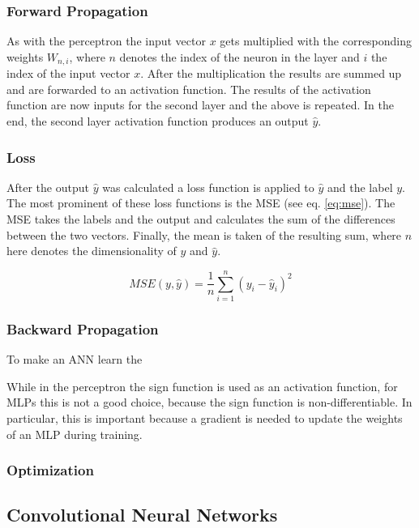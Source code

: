 \subsubsection{Forward Propagation}
As with the perceptron the input vector $x$ gets multiplied with the corresponding weights $W_{n,i}$, where $n$ denotes the index of the neuron in the layer and $i$ the index of the input vector $x$.
After the multiplication the results are summed up and are forwarded to an activation function.
The results of the activation function are now inputs for the second layer and the above is repeated.
In the end, the second layer activation function produces an output $\hat{y}$.

\subsubsection{Loss}
After the output $\hat{y}$ was calculated a loss function is applied to $\hat{y}$ and the  label $y$.
The most prominent of these loss functions is the \ac{MSE} (see eq. \ref{eq:mse}).
The \ac{MSE} takes the labels and the output and calculates the sum of the differences between the two vectors.
Finally, the mean is taken of the resulting sum, where $n$ here denotes the dimensionality of $y$ and $\hat{y}$.

\begin{equation}
    \label{eq:mse}
    MSE(y, \hat{y}) = \frac{1}{n} \sum_{i=1}^{n}(y_i - \hat{y}_i)^2
\end{equation}

\subsubsection{Backward Propagation}

To make an \ac{ANN} learn the

While in the perceptron the sign function is used as an activation function, for \acp{MLP} this is not a good choice, because the sign function is non-differentiable.
In particular, this is important because a gradient is needed to update the weights of an \ac{MLP} during training.



\subsubsection{Optimization}

\subsection{Convolutional Neural Networks}

